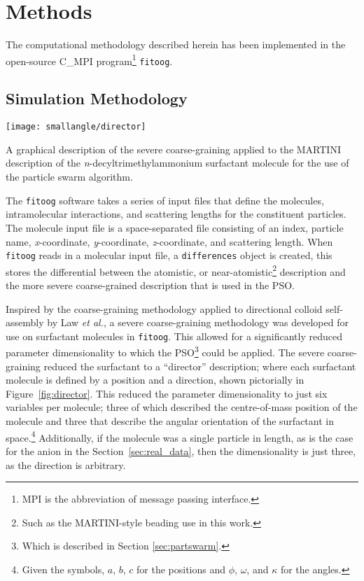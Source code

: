 \section{Methods}
The computational methodology described herein has been implemented in the open-source C\_MPI program\footnote{MPI is the abbreviation of message passing interface.} \texttt{fitoog}.\autocite{mccluskey_arm61/fitoog_2019}

\subsection{Simulation Methodology}
%
\begin{marginfigure}
    \centering
    \texttt{[image: smallangle/director]}
    \caption{A graphical description of the severe coarse-graining applied to the MARTINI description of the \emph{n}-decyltrimethylammonium surfactant molecule for the use of the particle swarm algorithm.}
    \label{fig:director}
\end{marginfigure}
%
The \texttt{fitoog} software takes a series of input files that define the molecules, intramolecular interactions, and scattering lengths for the constituent particles.
The molecule input file is a space-separated file consisting of an index, particle name, \emph{x}-coordinate, \emph{y}-coordinate, \emph{z}-coordinate, and scattering length.
When \texttt{fitoog} reads in a molecular input file, a \texttt{differences} object is created, this stores the differential between the atomistic, or near-atomistic\footnote{Such as the MARTINI-style beading use in this work.} description and the more severe coarse-grained description that is used in the PSO.

Inspired by the coarse-graining methodology applied to directional colloid self-assembly by Law \emph{et al.},\autocite{law_coarse-grained_2016} a severe coarse-graining methodology was developed for use on surfactant molecules in \texttt{fitoog}.
This allowed for a significantly reduced parameter dimensionality to which the PSO\footnote{Which is described in Section \ref{sec:partswarm}.} could be applied.
The severe coarse-graining reduced the surfactant to a ``director'' description; where each surfactant molecule is defined by a position and a direction, shown pictorially in Figure~\ref{fig:director}.
This reduced the parameter dimensionality to just six variables per molecule; three of which described the centre-of-mass position of the molecule and three that describe the angular orientation of the surfactant in space.\footnote{Given the symbols, $a$, $b$, $c$ for the positions and $\phi$, $\omega$, and $\kappa$ for the angles.}
Additionally, if the molecule was a single particle in length, as is the case for the  anion in the Section~\ref{sec:real_data}, then the dimensionality is just three, as the direction is arbitrary.

